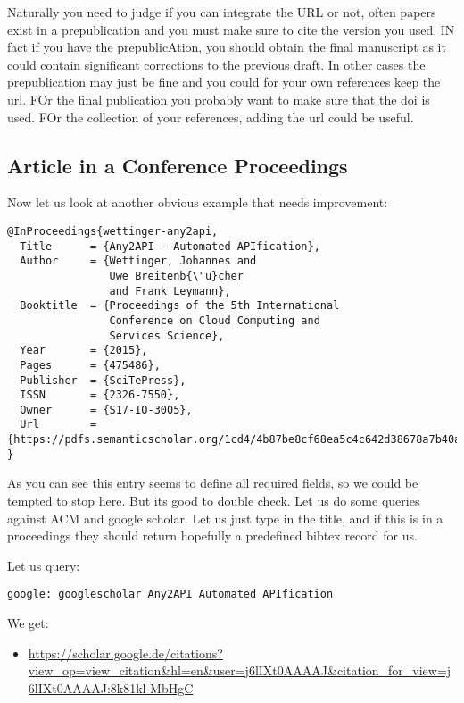 Naturally you need to judge if you can integrate the URL or not, often
papers exist in a prepublication and you must make sure to cite the
version you used. IN fact if you have the prepublicAtion, you should
obtain the final manuscript as it could contain significant
corrections to the previous draft. In other cases the prepublication
may just be fine and you could for your own references keep the
url. FOr the final publication you probably want to make sure that the
doi is used. FOr the collection of your references, adding the url
could be useful.

\subsection{Article in a Conference Proceedings}
\label{s:e:article-in-a-conference-proceedings}

Now let us look at another obvious example that needs improvement:

\begin{verbatim}
@InProceedings{wettinger-any2api,
  Title      = {Any2API - Automated APIfication},
  Author     = {Wettinger, Johannes and
                Uwe Breitenb{\"u}cher
                and Frank Leymann},
  Booktitle  = {Proceedings of the 5th International
                Conference on Cloud Computing and
                Services Science},
  Year       = {2015},
  Pages      = {475­486},
  Publisher  = {SciTePress},
  ISSN       = {2326-7550},
  Owner      = {S17-IO-3005},
  Url        = {https://pdfs.semanticscholar.org/1cd4/4b87be8cf68ea5c4c642d38678a7b40a86de.pdf}
}
\end{verbatim}

As you can see this entry seems to define all required fields, so we
could be tempted to stop here. But its good to double check. Let us do
some queries against ACM and google scholar. Let us just type in the
title, and if this is in a proceedings they should return hopefully a
predefined bibtex record for us.

Let us query:

\begin{verbatim}
google: googlescholar Any2API Automated APIfication
\end{verbatim}

We get:

\begin{itemize}

\item
  \url{https://scholar.google.de/citations?view_op=view_citation\&hl=en\&user=j6lIXt0AAAAJ\&citation_for_view=j6lIXt0AAAAJ:8k81kl-MbHgC}
\end{itemize}

